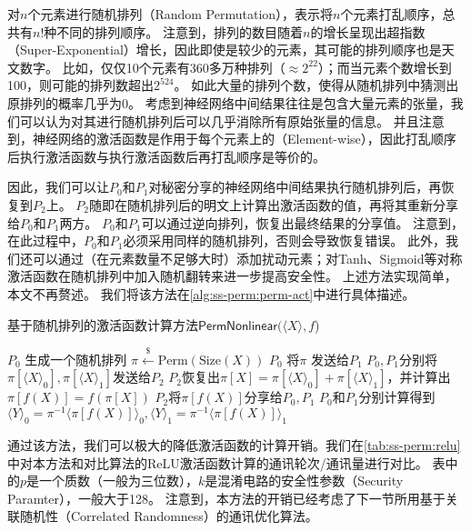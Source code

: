 对$n$个元素进行随机排列（Random Permutation），表示将$n$个元素打乱顺序，总共有$n!$种不同的排列顺序。
%
注意到，排列的数目随着$n$的增长呈现出超指数（Super-Exponential）增长，因此即使是较少的元素，其可能的排列顺序也是天文数字。
%
比如，仅仅10个元素有360多万种排列（$\approx 2^{22}$）；而当元素个数增长到100，则可能的排列数超出$2^{524}$。
%
如此大量的排列个数，使得从随机排列中猜测出原排列的概率几乎为0。
%
考虑到神经网络中间结果往往是包含大量元素的张量，我们可以认为对其进行随机排列后可以几乎消除所有原始张量的信息。
%
并且注意到，神经网络的激活函数是作用于每个元素上的（Element-wise），因此打乱顺序后执行激活函数与执行激活函数后再打乱顺序是等价的。

因此，我们可以让$P_0$和$P_1$对秘密分享的神经网络中间结果执行随机排列后，再恢复到$P_2$上。
%
$P_2$随即在随机排列后的明文上计算出激活函数的值，再将其重新分享给$P_0$和$P_1$两方。
%
$P_0$和$P_1$可以通过逆向排列，恢复出最终结果的分享值。
%
注意到，在此过程中，$P_0$和$P_1$必须采用同样的随机排列，否则会导致恢复错误。
%
此外，我们还可以通过（在元素数量不足够大时）添加扰动元素；对Tanh、Sigmoid等对称激活函数在随机排列中加入随机翻转来进一步提高安全性。
上述方法实现简单，本文不再赘述。
%
我们将该方法在\autoref{alg:ss-perm:perm-act}中进行具体描述。


\begin{algorithm}[h!]
    \caption{基于随机排列的激活函数计算方法{$\mathsf{PermNonlinear}(\langle X \rangle, f$)}}
    \label{alg:ss-perm:perm-act}
        \begin{algorithmic}[1]
        \State $P_0$ 生成一个随机排列 $\pi \stackrel{\$}{\gets} \text{Perm}(\text{Size}(X))$
        \State $P_0$ 将$\pi$ 发送给$P_1$
        \State $P_0, P_1$分别将$\pi[\langle X \rangle_0], \pi[\langle X \rangle_1]$发送给$P_2$
        \State $P_2$恢复出$\pi[X] = \pi[\langle X \rangle_0] + \pi[\langle X \rangle_1]$，并计算出$\pi[f(X)] = f(\pi[X])$
        \State $P_2$将$\pi[f(X)]$分享给$P_0, P_1$
        \State $P_0$和$P_1$分别计算得到$\langle Y \rangle_0 = \pi^{-1} \langle \pi[f(X)] \rangle_0, \langle Y \rangle_1 = \pi^{-1} \langle \pi[f(X)] \rangle_1$
    \end{algorithmic}
\end{algorithm}


通过该方法，我们可以极大的降低激活函数的计算开销。我们在\autoref{tab:ss-perm:relu}中对本方法和对比算法的ReLU激活函数计算的通讯轮次/通讯量进行对比。
%
表中的$p$是一个质数（一般为三位数），$k$是混淆电路的安全性参数（Security Paramter），一般大于128。
%
注意到，本方法的开销已经考虑了下一节所用基于关联随机性（Correlated Randomness）的通讯优化算法。

